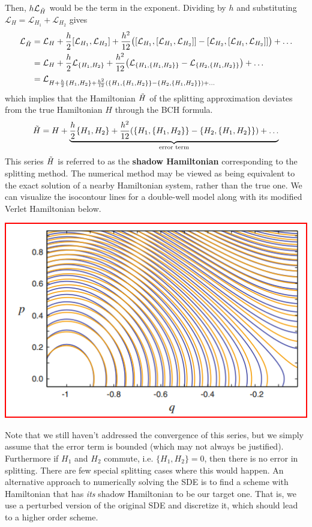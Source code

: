       Then, $h \mathcal{L}_{\Tilde{H}}$ would be the term in the exponent. Dividing by $h$ and substituting $\mathcal{L}_H = \mathcal{L}_{H_1} + \mathcal{L}_{H_2}$ gives 
      \begin{align*}
        \mathcal{L}_{\Tilde{H}} & = \mathcal{L}_H + \frac{h}{2} [\mathcal{L}_{H_1}, \mathcal{L}_{H_2}] + \frac{h^2}{12} \big( [\mathcal{L}_{H_1}, [\mathcal{L}_{H_1}, \mathcal{L}_{H_2}]] - [\mathcal{L}_{H_2}, [\mathcal{L}_{H_1}, \mathcal{L}_{H_2}]] \big) + \ldots \\
        & = \mathcal{L}_H + \frac{h}{2} \mathcal{L}_{\{H_1, H_2\}} + \frac{h^2}{12} \big( \mathcal{L}_{\{H_1, \{H_1, H_2\}\}} - \mathcal{L}_{\{H_2, \{H_1, H_2\}\}} \big) + \ldots \\
        & = \mathcal{L}_{H + \frac{h}{2} \{H_1, H_2\} + \frac{h^2}{12} (\{ H_1, \{H_1, H_2\}\} - \{H_2, \{H_1, H_2\}\}) + \ldots} 
      \end{align*}
      which implies that the Hamiltonian $\Tilde{H}$ of the splitting approximation deviates from the true Hamiltonian $H$ through the BCH formula. 
      \begin{equation}
        \Tilde{H} = H + \underbrace{\frac{h}{2} \{H_1, H_2\} + \frac{h^2}{12} (\{ H_1, \{H_1, H_2\}\} - \{H_2, \{H_1, H_2\}\}) + \ldots}_{\text{error term}}
      \end{equation}
      This series $\Tilde{H}$ is referred to as the \textbf{shadow Hamiltonian} corresponding to the splitting method. The numerical method may be viewed as being equivalent to the exact solution of a nearby Hamiltonian system, rather than the true one. We can visualize the isocontour lines for a double-well model along with its modified Verlet Hamiltonian below. 
      \begin{center}
        \includegraphics[scale=0.5]{img/Shadow_Hamiltonian.png}
      \end{center}
      Note that we still haven't addressed the convergence of this series, but we simply assume that the error term is bounded (which may not always be justified). Furthermore if $H_1$ and $H_2$ commute, i.e. $\{H_1, H_2\} = 0$, then there is no error in splitting. There are few special splitting cases where this would happen. An alternative approach to numerically solving the SDE is to find a scheme with Hamiltonian that has \textit{its} shadow Hamiltonian to be our target one. That is, we use a perturbed version of the original SDE and discretize it, which should lead to a higher order scheme. 

